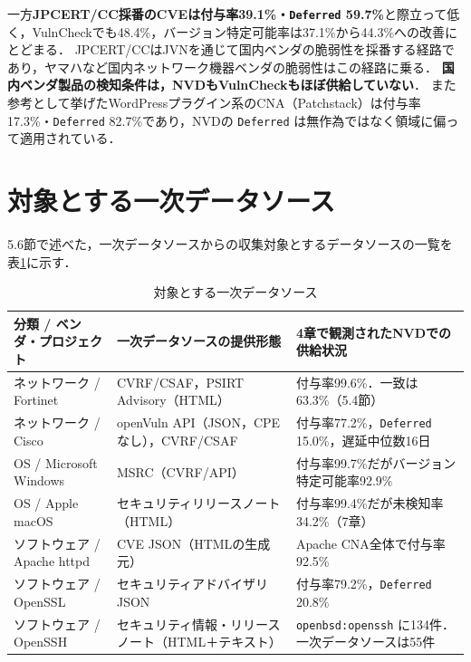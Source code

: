 一方\textbf{JPCERT/CC採番のCVEは付与率39.1\%・\texttt{Deferred} 59.7\%}と際立って低く，VulnCheckでも48.4\%，バージョン特定可能率は37.1\%から44.3\%への改善にとどまる．
JPCERT/CCはJVNを通じて国内ベンダの脆弱性を採番する経路であり，ヤマハなど国内ネットワーク機器ベンダの脆弱性はこの経路に乗る．
\textbf{国内ベンダ製品の検知条件は，NVDもVulnCheckもほぼ供給していない}．
また参考として挙げたWordPressプラグイン系のCNA（Patchstack）は付与率17.3\%・\texttt{Deferred} 82.7\%であり，NVDの \texttt{Deferred} は無作為ではなく領域に偏って適用されている．

\section{対象とする一次データソース}
\label{app:sources}

5.6節で述べた，一次データソースからの収集対象とするデータソースの一覧を表\ref{tab:sources}に示す．

\begin{table}[htbp]
  \caption{対象とする一次データソース}
  \label{tab:sources}
  \begin{center}
  \begin{tabular}{lll}
    \hline
    分類 / ベンダ・プロジェクト & 一次データソースの提供形態 & 4章で観測されたNVDでの供給状況 \\
    \hline
    ネットワーク / Fortinet & CVRF/CSAF，PSIRT Advisory（HTML） & 付与率99.6\%．一致は63.3\%（5.4節） \\
    ネットワーク / Cisco & openVuln API（JSON，CPEなし），CVRF/CSAF & 付与率77.2\%，\texttt{Deferred} 15.0\%，遅延中位数16日 \\
    OS / Microsoft Windows & MSRC（CVRF/API） & 付与率99.7\%だがバージョン特定可能率92.9\% \\
    OS / Apple macOS & セキュリティリリースノート（HTML） & 付与率99.4\%だが未検知率34.2\%（7章） \\
    ソフトウェア / Apache httpd & CVE JSON（HTMLの生成元） & Apache CNA全体で付与率92.5\% \\
    ソフトウェア / OpenSSL & セキュリティアドバイザリJSON & 付与率79.2\%，\texttt{Deferred} 20.8\% \\
    ソフトウェア / OpenSSH & セキュリティ情報・リリースノート（HTML＋テキスト） & \texttt{openbsd:openssh} に134件．一次データソースは55件 \\
    \hline
  \end{tabular}
  \end{center}
\end{table}

